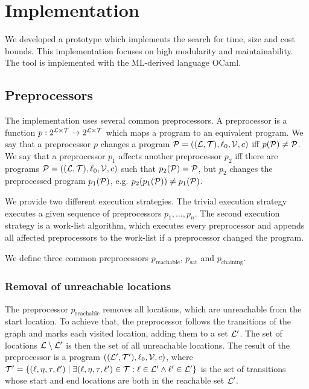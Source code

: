 \section{Implementation}

We developed a prototype which implements the search for time, size and cost bounds.
This implementation focuses on high modularity and maintainability.
The tool is implemented with the ML-derived language OCaml.

\subsection{Preprocessors}

The implementation uses several common preprocessors.
A preprocessor is a function $p: 2^{\mathcal{L} \times \mathcal{T}} \rightarrow 2^{\mathcal{L} \times \mathcal{T}}$ which maps a program to an equivalent program.
We say that a preprocessor $p$ changes a program $\mathcal{P} = ((\mathcal{L}, \mathcal{T}), \ell_0, \mathcal{V}, c)$ iff $p(\mathcal{P}) \neq \mathcal{P}$.
We say that a preprocessor $p_1$ affects another preprocessor $p_2$ iff there are programs $\mathcal{P} = ((\mathcal{L}, \mathcal{T}), \ell_0, \mathcal{V}, c)$ such that $p_2(\mathcal{P}) = \mathcal{P}$, but $p_2$ changes the preprocessed program $p_1(\mathcal{P})$, e.g. $p_2(p_1(\mathcal{P})) \neq p_1(\mathcal{P})$.

We provide two different execution strategies.
The trivial execution strategy executes a given sequence of preprocessors $p_1, \dots, p_n$.
The second execution strategy is a work-list algorithm, which executes every preprocessor and appends all affected preprocessors to the work-list if a preprocessor changed the program.

We define three common preprocessors $p_{\text{reachable}}$, $p_{\text{sat}}$ and $p_{\text{chaining}}$.

\subsubsection{Removal of unreachable locations}

The preprocessor $p_{\text{reachable}}$ removes all locations, which are unreachable from the start location.
To achieve that, the preprocessor follows the transitions of the graph and marks each visited location, adding them to a set $\mathcal{L}'$.
The set of locations $\mathcal{L} \setminus \mathcal{L}'$ is then the set of all unreachable locations.
The result of the preprocessor is a program $((\mathcal{L}', \mathcal{T}'), \ell_0, \mathcal{V}, c)$, where $\mathcal{T}' = \lbrace (\ell,\eta,\tau,\ell') \mid \exists (\ell,\eta,\tau,\ell') \in \mathcal{T}: \ell \in \mathcal{L}' \wedge \ell' \in \mathcal{L}' \rbrace$ is the set of transitions whose start and end locations are both in the reachable set $\mathcal{L}'$.

